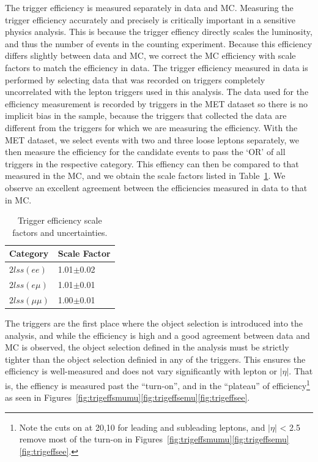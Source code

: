 The trigger efficiency is measured separately in data and MC. Measuring the trigger efficiency accurately and precisely is critically
important in a sensitive physics analysis. This is because the trigger effiency directly scales the luminosity, and thus the number
of events in the counting experiment.
Because this efficiency differs slightly between data and MC, we correct the MC efficiency with scale factors to match the
efficiency in data. The trigger efficiency measured in data is performed by selecting data that was recorded on triggers completely
uncorrelated with the lepton triggers used in this analysis. The data used for the efficiency measurement is recorded by triggers in
the MET dataset so there is no implicit bias in the sample, because the triggers that collected the data are different from the triggers
for which we are measuring the efficiency. With the MET dataset, we select events with two and three loose leptons separately, we then measure
the efficiency for the candidate events to pass the `OR' of all triggers in the respective category. This effiency can then be compared
to that measured in the MC, and we obtain the scale factors listed in Table~\ref{tab:trigger_sf}. We observe an excellent agreement between
the efficiencies measured in data to that in MC. 


\begin{table}[hbtp]
\centering
\caption{Trigger efficiency scale factors and uncertainties.}
\begin{tabular}{l|l}
\hline
Category & Scale Factor \\
\hline
$2lss (ee)$ & 1.01$\pm$0.02 \\
$2lss (e\mu)$ & 1.01$\pm$0.01 \\
$2lss (\mu\mu)$ & 1.00$\pm$0.01 \\
\hline
\end{tabular}
\label{tab:trigger_sf}
\end{table}

The triggers are the first place where the object selection is introduced into the analysis, and while the efficiency is high
and a good agreement between data and MC is observed,
the object selection defined in the analysis must be strictly tighter than the object selection definied in any of the triggers. This ensures
the efficiency is well-measured and does not vary significantly with lepton \pt or $|\eta|$. That is, the effiency is measured past the ``turn-on'',
and in the ``plateau'' of efficiency\footnote{Note the cuts on \pt at 20,10 for leading and subleading leptons, and $|\eta|$ < 2.5 remove most
of the turn-on in Figures~\ref{fig:trigeffsmumu}\ref{fig:trigeffsemu}\ref{fig:trigeffsee}.}
as seen in Figures~\ref{fig:trigeffsmumu}\ref{fig:trigeffsemu}\ref{fig:trigeffsee}. 

